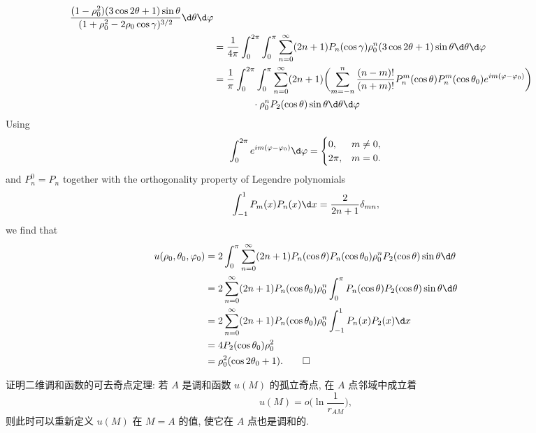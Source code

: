 \begin{solution}
\begin{equation}
\begin{aligned}
          \frac{(1-\rho_0^2)(3\cos2\theta+1)\sin\theta}{(1+\rho_0^2-2\rho_0\cos\gamma)^{3/2}}
          \d\theta\d\varphi \\
      & = \frac{1}{4\pi} \int_0^{2\pi} \int_0^\pi
          \sum_{n=0}^\infty (2n+1) P_n(\cos\gamma)\rho_0^n (3\cos2\theta+1) \sin\theta
          \d\theta\d\varphi \\
      & = \frac{1}{\pi} \int_0^{2\pi} \int_0^\pi
          \sum_{n=0}^\infty (2n+1) \biggl(\sum_{m=-n}^n \frac{(n-m)!}{(n+m)!} P_n^m(\cos\theta)
          P_n^m(\cos\theta_0) e^{im(\varphi-\varphi_0)}\biggr) \\
      & \qquad\qquad \cdot\rho_0^n P_2(\cos\theta) \sin\theta \d\theta\d\varphi
    \end{aligned}
  \end{equation}
  Using
  \[ \int_0^{2\pi} e^{im(\varphi-\varphi_0)} \d\varphi
      = \begin{cases}
        0,    & m\neq 0, \\
        2\pi, & m=0.
      \end{cases}\]
  and $P_n^0=P_n$ together with the orthogonality property of Legendre polynomials
  \[ \int_{-1}^1 P_m(x)P_n(x) \d x = \frac{2}{2n+1}\delta_{mn}, \]
  we find that
  \begin{equation}\label{eq:3.8}
    \begin{aligned}
      u(\rho_0,\theta_0,\varphi_0)
      & = 2 \int_0^\pi \sum_{n=0}^\infty (2n+1) P_n(\cos\theta) P_n(\cos\theta_0)
          \rho_0^n P_2(\cos\theta) \sin\theta \d\theta \\
      & = 2 \sum_{n=0}^\infty (2n+1) P_n(\cos\theta_0) \rho_0^n
          \int_0^\pi P_n(\cos\theta) P_2(\cos\theta) \sin\theta \d\theta \\
      & = 2 \sum_{n=0}^\infty (2n+1) P_n(\cos\theta_0) \rho_0^n
          \int_{-1}^1 P_n(x) P_2(x) \d x \\
      & = 4 P_2(\cos\theta_0) \rho_0^2 \\
      & = \rho_0^2 (\cos2\theta_0+1). \qedhere
    \end{aligned}
  \end{equation}
\end{solution}


\begin{exercise}
  证明二维调和函数的可去奇点定理:
  若 $A$ 是调和函数 $u(M)$ 的孤立奇点, 在 $A$ 点邻域中成立着
  \begin{equation}
    u(M) = o\biggl(\ln\frac{1}{r_{AM}}\biggr), \tag{$\star$}
  \end{equation}
  则此时可以重新定义 $u(M)$ 在 $M=A$ 的值, 使它在 $A$ 点也是调和的.
\end{exercise}

